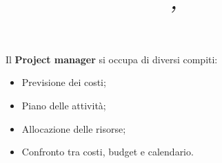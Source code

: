 


\pagestyle{fancy}
\rhead{\firstxmark} %
\lfoot{\lastxmark} %
\cfoot{} %
\renewcommand\headrulewidth{0.4pt} %
\renewcommand\footrulewidth{0.4pt} %


\title{
\vspace{2in}
\textmd{\textbf{}\\
\normalsize\vspace{0.1in}\small{}\\
\vspace{0.1in}\large{\textit{,\ }}
\vspace{3in}
}
}

\author{\textbf{}}
\date{} %




\maketitle
\newpage
\newpage

Il \textbf{Project manager} si occupa di diversi compiti:

\begin{itemize}

	\item Previsione dei costi;
	\item Piano delle attività;
	\item Allocazione delle risorse;
	\item Confronto tra costi, budget e calendario.

\end{itemize}

